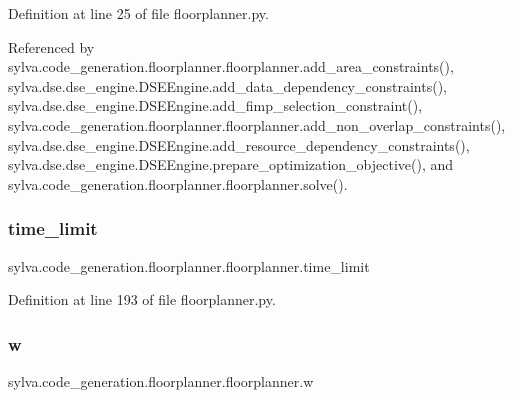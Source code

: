 Definition at line 25 of file floorplanner.\+py.



Referenced by sylva.\+code\+\_\+generation.\+floorplanner.\+floorplanner.\+add\+\_\+area\+\_\+constraints(), sylva.\+dse.\+dse\+\_\+engine.\+D\+S\+E\+Engine.\+add\+\_\+data\+\_\+dependency\+\_\+constraints(), sylva.\+dse.\+dse\+\_\+engine.\+D\+S\+E\+Engine.\+add\+\_\+fimp\+\_\+selection\+\_\+constraint(), sylva.\+code\+\_\+generation.\+floorplanner.\+floorplanner.\+add\+\_\+non\+\_\+overlap\+\_\+constraints(), sylva.\+dse.\+dse\+\_\+engine.\+D\+S\+E\+Engine.\+add\+\_\+resource\+\_\+dependency\+\_\+constraints(), sylva.\+dse.\+dse\+\_\+engine.\+D\+S\+E\+Engine.\+prepare\+\_\+optimization\+\_\+objective(), and sylva.\+code\+\_\+generation.\+floorplanner.\+floorplanner.\+solve().

\mbox{\label{classsylva_1_1code__generation_1_1floorplanner_1_1floorplanner_aa6a27c1e810c6242a6876d943e108460}} 
\subsubsection{\texorpdfstring{time\+\_\+limit}{time\_limit}}
{\footnotesize\ttfamily sylva.\+code\+\_\+generation.\+floorplanner.\+floorplanner.\+time\+\_\+limit}



Definition at line 193 of file floorplanner.\+py.

\mbox{\label{classsylva_1_1code__generation_1_1floorplanner_1_1floorplanner_a4b3bde987121cd07a0e7247980060f29}} 
\subsubsection{\texorpdfstring{w}{w}}
{\footnotesize\ttfamily sylva.\+code\+\_\+generation.\+floorplanner.\+floorplanner.\+w}



